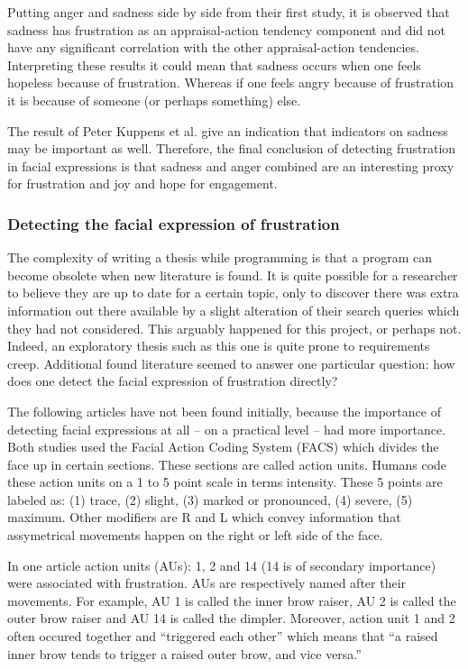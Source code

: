 Putting anger and sadness side by side from their first study, it is observed that sadness has frustration as an appraisal-action tendency component and did not have any significant correlation with the other appraisal-action tendencies. Interpreting these results it could mean that sadness occurs when one feels hopeless because of frustration. Whereas if one feels angry because of frustration it is because of someone (or perhaps something) else. 

The result of Peter Kuppens et al. give an indication that indicators on sadness may be important as well. Therefore, the final conclusion of detecting frustration in facial expressions is that sadness and anger combined are an interesting proxy for frustration and joy and hope for engagement.

\subsubsection{Detecting the facial expression of frustration}
\label{frustration_facial_expression_literature}
The complexity of writing a thesis while programming is that a program can become obsolete when new literature is found. It is quite possible for a researcher to believe they are up to date for a certain topic, only to discover there was extra information out there available by a slight alteration of their search queries which they had not considered. This arguably happened for this project, or perhaps not. Indeed, an exploratory thesis such as this one is quite prone to requirements creep. Additional found literature seemed to answer one particular question: how does one detect the facial expression of frustration directly?

The following articles have not been found initially, because the importance of detecting facial expressions at all -- on a practical level -- had more importance. Both studies used the Facial Action Coding System (FACS) which divides the face up in certain sections. These sections are called action units. Humans code these action units on a 1 to 5 point scale in terms intensity. These 5 points are labeled as: (1) trace, (2) slight, (3) marked or pronounced, (4) severe, (5) maximum. Other modifiers are R and L which convey information that assymetrical movements happen on the right or left side of the face. 

In one article action units (AUs): 1, 2 and 14 (14 is of secondary importance) were associated with frustration. AUs are respectively named after their movements. For example, AU 1 is called the inner brow raiser, AU 2 is called the outer brow raiser and AU 14 is called the dimpler. Moreover, action unit 1 and 2 often occured together and ``triggered each other'' \cite{craig2008} which means that ``a raised inner brow tends to trigger a raised outer brow, and vice versa.'' \cite{craig2008}

